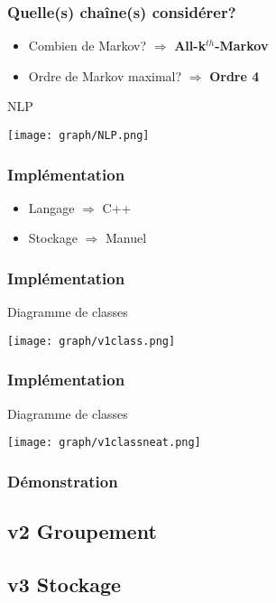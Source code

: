 \documentclass{beamer}
\begin{document}
            \begin{frame}
                \frametitle{Quelle(s) chaîne(s) considérer?}
                \begin{itemize}
                    \pause[2]
                    \item Combien de Markov? \pause[3] $\Rightarrow$ \textbf{All-k}$^{th}$\textbf{-Markov}
                    \pause[4]
                    \item Ordre de Markov maximal? \pause[6] $\Rightarrow$ \textbf{Ordre 4}
                    \pause[5]
                \end{itemize}
                \begin{exampleblock}{NLP}
                    \begin{center}
                        \texttt{[image: graph/NLP.png]}
                    \end{center}
                \end{exampleblock}
            \end{frame}
            \begin{frame}
                \frametitle{Implémentation}
                \begin{itemize}
                    \pause
                    \item Langage  \pause $\Rightarrow$ C++
                    \pause
                    \item Stockage \pause $\Rightarrow$ Manuel
                \end{itemize}
            \end{frame}
            \begin{frame}
                \frametitle{Implémentation}
                \pause
                \begin{block}{Diagramme de classes}
                    \begin{center}
                        \texttt{[image: graph/v1class.png]}
                    \end{center}
                \end{block}
            \end{frame}
            \begin{frame}
                \frametitle{Implémentation}
                \begin{block}{Diagramme de classes}
                    \begin{center}
                        \texttt{[image: graph/v1classneat.png]}
                    \end{center}
                \end{block}
            \end{frame}
            \begin{frame}
                \frametitle{Démonstration}
            \end{frame}
        \subsection{v2 Groupement}
        \subsection{v3 Stockage}
\end{document}
